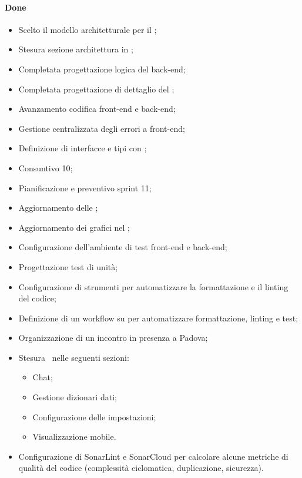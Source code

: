 \paragraph{Done}
\begin{itemize}
	\item Scelto il modello architetturale per il ;
	\item Stesura sezione architettura in \ST;
	\item Completata progettazione logica del back-end;
	\item Completata progettazione di dettaglio del ;
	\item Avanzamento codifica front-end e back-end;
	\item Gestione centralizzata degli errori a front-end;
	\item Definizione di interfacce e tipi con ;
	\item Consuntivo  10;
	\item Pianificazione e preventivo sprint 11;
	\item Aggiornamento delle \NdP;
	\item Aggiornamento dei grafici nel \PdQ;
	\item Configurazione dell'ambiente di test front-end e back-end;
	\item Progettazione test di unità;
	\item Configurazione di strumenti per automatizzare la formattazione e il linting del codice;
	\item Definizione di un workflow su  per automatizzare formattazione, linting e test;
	\item Organizzazione di un incontro in presenza a Padova;
	\item Stesura \MU\ nelle seguenti sezioni:
	\begin{itemize}
		\item Chat;
		\item Gestione dizionari dati;
		\item Configurazione delle impostazioni;
		\item Visualizzazione mobile.
	\end{itemize}
	\item Configurazione di SonarLint e SonarCloud per calcolare alcune metriche di qualità del codice (complessità ciclomatica, duplicazione, sicurezza).
\end{itemize}

